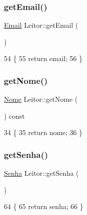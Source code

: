 \subsubsection{\texorpdfstring{get\+Email()}{getEmail()}}
{\footnotesize\ttfamily \mbox{\hyperlink{class_email}{Email}} Leitor\+::get\+Email (\begin{DoxyParamCaption}{ }\end{DoxyParamCaption})\hspace{0.3cm}{\ttfamily [inline]}}


\begin{DoxyCode}
54  \{
55    \textcolor{keywordflow}{return} email;
56  \}
\end{DoxyCode}
\mbox{\label{class_leitor_af12cee66e7318fcbb6a0e407a40fb902}} 
\subsubsection{\texorpdfstring{get\+Nome()}{getNome()}}
{\footnotesize\ttfamily \mbox{\hyperlink{class_nome}{Nome}} Leitor\+::get\+Nome (\begin{DoxyParamCaption}{ }\end{DoxyParamCaption}) const\hspace{0.3cm}{\ttfamily [inline]}}


\begin{DoxyCode}
34                          \{
35         \textcolor{keywordflow}{return} nome;
36     \}
\end{DoxyCode}
\mbox{\label{class_leitor_ae9e88af5c4f0db47e6c19040f7281f2a}} 
\subsubsection{\texorpdfstring{get\+Senha()}{getSenha()}}
{\footnotesize\ttfamily \mbox{\hyperlink{class_senha}{Senha}} Leitor\+::get\+Senha (\begin{DoxyParamCaption}{ }\end{DoxyParamCaption})\hspace{0.3cm}{\ttfamily [inline]}}


\begin{DoxyCode}
64 \{
65  \textcolor{keywordflow}{return} senha;
66 \}
\end{DoxyCode}
\mbox{\label{class_leitor_ad8cf5a7cedecd12d087f7dde668c724a}} 
